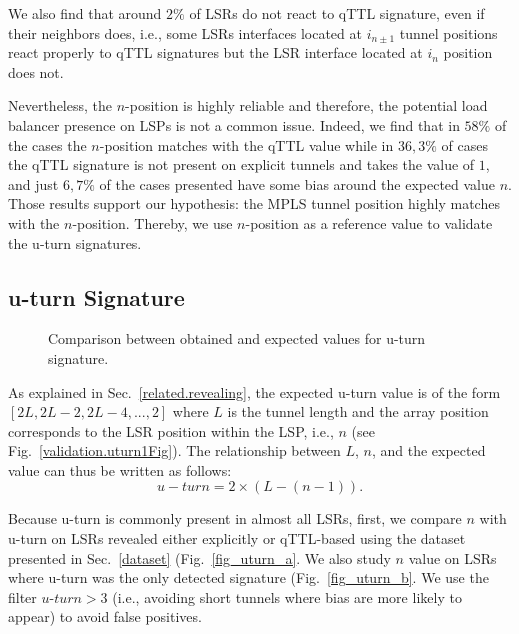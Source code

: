 We also find that around $2\%$ of LSRs do not react to qTTL signature, even if
their neighbors does, i.e., some LSRs interfaces located at $i_{n \pm 1}$
tunnel positions react properly to qTTL signatures but the LSR interface located
at $i_n$ position does not.

Nevertheless, the $n$-position is highly reliable and therefore, the potential
load balancer presence on LSPs is not a common issue. Indeed, we find that in
$58\%$ of the cases the $n$-position matches with the qTTL value while in $36,3\%$ of cases
the qTTL signature is not present on explicit tunnels and takes the value of
$1$, and just $6,7\%$ of the cases presented have some bias around the expected
value $n$. Those results support our hypothesis: the  MPLS tunnel position
highly matches with the $n$-position. Thereby, we use $n$-position as a
reference value to validate the u-turn signatures.

\subsection{u-turn Signature}\label{validation.uturn}
\begin{figure}[!t]
  \begin{center}    
\hspace{-0.3cm}      
  \end{center}
  \caption{Comparison between obtained and expected values for u-turn
  signature.}
  \label{validation.uturn.fig}
\end{figure}

As explained in Sec.~\ref{related.revealing},  the expected u-turn value is of
the form $[2L, 2L-2, 2L-4,..., 2]$ where $L$ is the tunnel length and the array
position corresponds to the LSR position within the LSP, i.e., $n$ (see
Fig.~\ref{validation.uturn1Fig}).  The relationship between $L$, $n$, and the
expected value can thus be written as follows:
\begin{equation}
u-turn = 2 \times (L - (n-1)) .
\label{eqn.uturn}
\end{equation}

Because u-turn is commonly present in almost all LSRs, first, we compare $n$
with u-turn on LSRs revealed either explicitly or qTTL-based using the dataset
presented in Sec.~\ref{dataset} (Fig.~\ref{fig_uturn_a}. We also study 
$n$ value on LSRs where u-turn was the only detected signature
(Fig.~\ref{fig_uturn_b}. We use the filter $\textit{u-turn}>3$ (i.e., avoiding
short tunnels where bias are more likely to appear) to avoid false positives.

